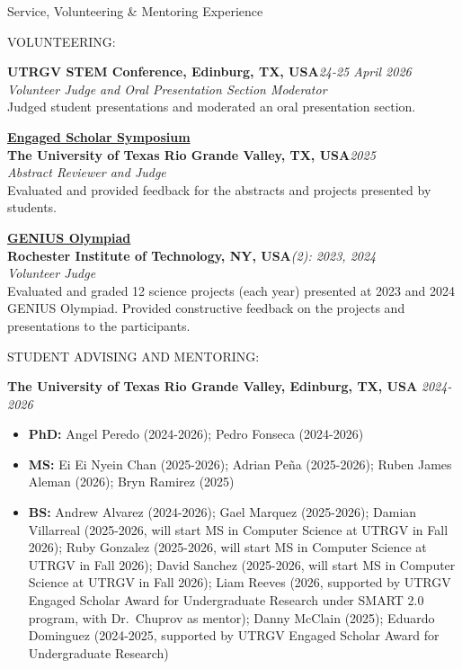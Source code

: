 \documentclass[10pt]{resume} %
\begin{document}
\begin{rSection}{Service, Volunteering \& Mentoring Experience}
\item VOLUNTEERING:

\textbf{UTRGV STEM Conference, Edinburg, TX, USA}\hfill\small{\em 24-25 April 2026}\normalsize
\\{\em Volunteer Judge and Oral Presentation Section Moderator}
\\ Judged student presentations and moderated an oral presentation section.

\href{https://www.utrgv.edu/es2/}{\textbf{Engaged Scholar Symposium}}\\
\textbf{The University of Texas Rio Grande Valley, TX, USA}\hfill\small{\em 2025}\normalsize
\\{\em Abstract Reviewer and Judge}
\\ Evaluated and provided feedback for the abstracts and projects presented by students.

\href{https://geniusolympiad.org/}{\textbf{GENIUS Olympiad}}\\
\textbf{Rochester Institute of Technology, NY, USA}\hfill\small{\em (2): 2023, 2024}\normalsize
\\{\em Volunteer Judge}
\\ Evaluated and graded 12 science projects (each year) presented at 2023 and 2024 GENIUS Olympiad. Provided constructive feedback on the projects and presentations to the participants.

\item STUDENT ADVISING AND MENTORING:

\textbf{The University of Texas Rio Grande Valley, Edinburg, TX, USA} \hfill\small{\em 2024-2026}\normalsize
\begin{itemize}\itemsep-0.5em
\item \textbf{PhD:} Angel Peredo (2024-2026); Pedro Fonseca (2024-2026)
\item \textbf{MS:} Ei Ei Nyein Chan (2025-2026); Adrian Peña (2025-2026); Ruben James Aleman (2026); Bryn Ramirez (2025)
\item \textbf{BS:} Andrew Alvarez (2024-2026); Gael Marquez (2025-2026); Damian Villarreal (2025-2026, will start MS in Computer Science at UTRGV in Fall 2026); Ruby Gonzalez (2025-2026, will start MS in Computer Science at UTRGV in Fall 2026); David Sanchez (2025-2026, will start MS in Computer Science at UTRGV in Fall 2026); Liam Reeves (2026, supported by UTRGV Engaged Scholar Award for Undergraduate Research under SMART 2.0 program, with Dr.\ Chuprov as mentor); Danny McClain (2025); Eduardo Dominguez (2024-2025, supported by UTRGV Engaged Scholar Award for Undergraduate Research)
\end{itemize}


\end{rSection}
\end{document}
